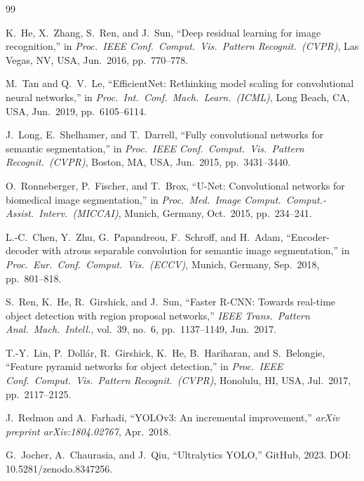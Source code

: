 \documentclass[12pt,a4paper]{article}
\begin{document}
\newpage
\renewcommand{\refname}{Article Survey --- References}
\begin{thebibliography}{99}

K.~He, X.~Zhang, S.~Ren, and J.~Sun,
``Deep residual learning for image recognition,''
in \textit{Proc.\ IEEE Conf.\ Comput.\ Vis.\ Pattern Recognit.\ (CVPR)},
Las Vegas, NV, USA, Jun.\ 2016, pp.\ 770--778.

M.~Tan and Q.~V.~Le,
``EfficientNet: Rethinking model scaling for convolutional neural networks,''
in \textit{Proc.\ Int.\ Conf.\ Mach.\ Learn.\ (ICML)},
Long Beach, CA, USA, Jun.\ 2019, pp.\ 6105--6114.

J.~Long, E.~Shelhamer, and T.~Darrell,
``Fully convolutional networks for semantic segmentation,''
in \textit{Proc.\ IEEE Conf.\ Comput.\ Vis.\ Pattern Recognit.\ (CVPR)},
Boston, MA, USA, Jun.\ 2015, pp.\ 3431--3440.

O.~Ronneberger, P.~Fischer, and T.~Brox,
``U-Net: Convolutional networks for biomedical image segmentation,''
in \textit{Proc.\ Med.\ Image Comput.\ Comput.-Assist.\ Interv.\ (MICCAI)},
Munich, Germany, Oct.\ 2015, pp.\ 234--241.

L.-C.~Chen, Y.~Zhu, G.~Papandreou, F.~Schroff, and H.~Adam,
``Encoder-decoder with atrous separable convolution for semantic image segmentation,''
in \textit{Proc.\ Eur.\ Conf.\ Comput.\ Vis.\ (ECCV)},
Munich, Germany, Sep.\ 2018, pp.\ 801--818.

S.~Ren, K.~He, R.~Girshick, and J.~Sun,
``Faster R-CNN: Towards real-time object detection with region proposal networks,''
\textit{IEEE Trans.\ Pattern Anal.\ Mach.\ Intell.},
vol.\ 39, no.\ 6, pp.\ 1137--1149, Jun.\ 2017.

T.-Y.~Lin, P.~Doll{\'a}r, R.~Girshick, K.~He, B.~Hariharan, and S.~Belongie,
``Feature pyramid networks for object detection,''
in \textit{Proc.\ IEEE Conf.\ Comput.\ Vis.\ Pattern Recognit.\ (CVPR)},
Honolulu, HI, USA, Jul.\ 2017, pp.\ 2117--2125.

J.~Redmon and A.~Farhadi,
``YOLOv3: An incremental improvement,''
\textit{arXiv preprint arXiv:1804.02767}, Apr.\ 2018.

G.~Jocher, A.~Chaurasia, and J.~Qiu,
``Ultralytics YOLO,''
GitHub, 2023.
DOI: 10.5281/zenodo.8347256.


\end{thebibliography}
\end{document}
